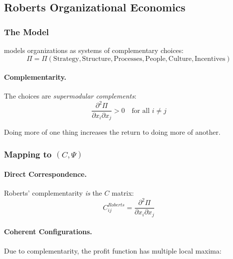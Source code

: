 \documentclass[12pt,a4paper]{article}
\begin{document}
\subsection{Roberts Organizational Economics}
\label{app:roberts}

\subsubsection{The Model}

\citet{roberts2004} models organizations as systems of complementary choices:
\begin{equation}
  \Pi = \Pi(\text{Strategy}, \text{Structure}, \text{Processes}, \text{People}, \text{Culture}, \text{Incentives})
\end{equation}

\paragraph{Complementarity.}
The choices are \emph{supermodular complements}:
\begin{equation}
  \frac{\partial^2 \Pi}{\partial x_i \partial x_j} > 0 \quad \text{for all } i \neq j
\end{equation}

Doing more of one thing increases the return to doing more of another.

\subsubsection{Mapping to $(C, \Psi)$}

\paragraph{Direct Correspondence.}
Roberts' complementarity \emph{is} the $C$ matrix:
\begin{equation}
  C^{Roberts}_{ij} = \frac{\partial^2 \Pi}{\partial x_i \partial x_j}
\end{equation}

\paragraph{Coherent Configurations.}
Due to complementarity, the profit function has multiple local maxima:
\end{document}
